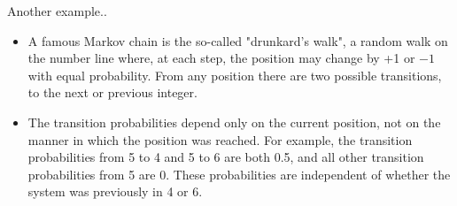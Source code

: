 \documentclass[compress]{beamer}
\begin{document}
\begin{frame}{Another example..}
	\begin{itemize}
		\item A famous Markov chain is the so-called "drunkard's walk", a random walk on the number line where, at each step, the position may change by +1 or $-1$ with equal probability. From any position there are two possible transitions, to the next or previous integer. 
		\pause \item The transition probabilities depend only on the current position, not on the manner in which the position was reached. For example, the transition probabilities from 5 to 4 and 5 to 6 are both 0.5, and all other transition probabilities from 5 are 0. These probabilities are independent of whether the system was previously in 4 or 6.
	\end{itemize}
\end{frame}
\end{document}
